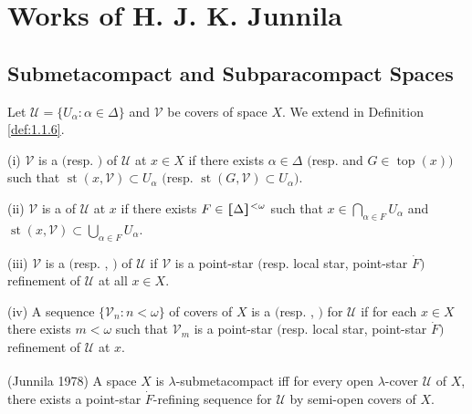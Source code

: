 \documentclass[main.tex]{subfiles}
\begin{document}
	
\chapter{Works of H. J. K. Junnila} \label{ch4}

\section{Submetacompact and Subparacompact Spaces} \label{sec:4.1}

{ \label{def:4.1.1}
Let $\mathscr{U}=\{U_\alpha: \alpha\in\Delta\}$ and $\mathscr{V}$ be covers of space $X$. 
We extend  in Definition \ref{def:1.1.6}. 

\textup{(i)} $\mathscr{V}$ is a 
$($resp. $)$ 
 of $\mathscr{U}$ 
at $x \in X$ if there exists $\alpha\in\Delta$ $($resp. and $G \in\operatorname{top}(x))$
such that $\operatorname{st}(x, \mathscr{V}) \subset U_\alpha$
$($resp. $\operatorname{st}(G, \mathscr{V}) \subset U_\alpha)$. 

\textup{(ii)} $\mathscr{V}$ is a 
of $\mathscr{U}$ at $x$ if there exists 
$F \in \hstretch{1.8}{[}\Delta\hstretch{1.8}{]}^{<\omega}$ such that $x \in \bigcap_{\alpha \in F} U_\alpha$ 
and $\operatorname{st}(x, \mathscr{V}) \subset \bigcup_{\alpha\in F}U_\alpha$.

\textup{(iii)} $\mathscr{V}$ is a 
 $($resp. , 
$)$   of $\mathscr{U}$ if $\mathscr{V}$ is a point-star $($resp. local star, point-star $\dot{F})$ refinement
of $\mathscr{U}$ at all $x \in X$.

\textup{(iv)} A sequence $\{\mathscr{V}_n: n < \omega\}$ of covers of $X$ is a 
 $($resp. , 
$)$  
for $\mathscr{U}$ if for 
each $x \in X$ there exists $m < \omega$ such that $\mathscr{V}_m$ is a point-star $($resp. 
local star, point-star $\dot{F})$ refinement of $\mathscr{U}$ at $x$.
}

{\theorem{} \label{th:4.1.2} 
\textup{(\hstretch{1.8}{[}Junnila 1978\hstretch{1.8}{]}\textsuperscript{\cite{Junnila1978}})}
A space $X$ is $\lambda$-submetacompact iff for every open $\lambda$-cover $\mathscr{U}$ of $X$, 
there exists a point-star $\dot{F}$-refining sequence for $\mathscr{U}$ 
by semi-open covers of $X$.
}
\end{document}
